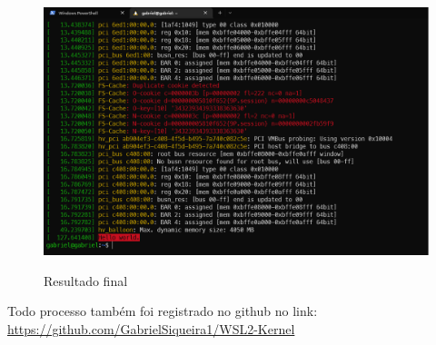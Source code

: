 \documentclass[a4paper, 12pt]{article}
\begin{document}
\begin{figure}[!ht]
\centering 
\includegraphics[width=13.5cm]{final.png}
\label{figura:final}
\caption{Resultado final}
\end{figure}

\newpage

\noindent Todo processo também foi registrado no github no link: \url{https://github.com/GabrielSiqueira1/WSL2-Kernel}
\end{document}
